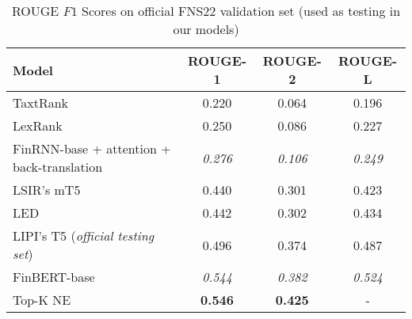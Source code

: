 \begin{table}[ht]
    \centering
    \begin{tabular}{lccc}
        \toprule
        \textbf{Model} & \textbf{ROUGE-1} & \textbf{ROUGE-2} & \textbf{ROUGE-L} \\
        \midrule
            TaxtRank & 0.220 & 0.064 & 0.196 \\
            LexRank & 0.250 & 0.086 & 0.227 \\
        \midrule
            FinRNN-base + attention + back-translation & \emph{0.276} & \emph{0.106} & \emph{0.249} \\
            LSIR's mT5 & 0.440 & 0.301 & 0.423 \\
            LED & 0.442 & 0.302 & 0.434 \\
            LIPI's T5 (\emph{official testing set}) & 0.496 & 0.374 & 0.487 \\
            FinBERT-base & \emph{0.544} & \emph{0.382} & \emph{0.524} \\
            Top-K NE & \textbf{0.546} & \textbf{0.425} & - \\
        \bottomrule
    \end{tabular}\caption{ROUGE $F1$ Scores on official FNS22 validation set (used as testing in our models)}
    \label{tab:rouge_performance_validation_fns}
\end{table}

